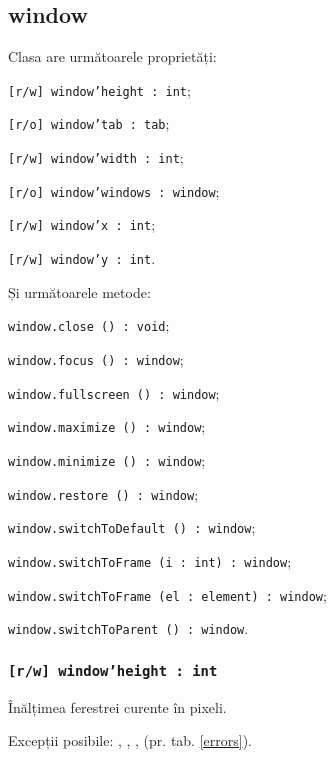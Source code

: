 \subsection{window}

Clasa \window{} are următoarele proprietăți:
\begin{icItems}
	\item \texttt{[r/w] window'height : int};
	\item \texttt{[r/o] window'tab : tab};
	\item \texttt{[r/w] window'width : int};
	\item \texttt{[r/o] window'windows : window};
	\item \texttt{[r/w] window'x : int};
	\item \texttt{[r/w] window'y : int}.
\end{icItems}

Și următoarele metode:
\begin{icItems}
	\item \texttt{window.close () : void};
	\item \texttt{window.focus () : window};
	\item \texttt{window.fullscreen () : window};
	\item \texttt{window.maximize () : window};
	\item \texttt{window.minimize () : window};
	\item \texttt{window.restore () : window};
	\item \texttt{window.switchToDefault () : window};
	\item \texttt{window.switchToFrame (i : int) : window};
	\item \texttt{window.switchToFrame (el : element) : window};
	\item \texttt{window.switchToParent () : window}.
\end{icItems}

\subsubsection{\texttt{[r/w] window'height : int}}

Înălțimea ferestrei curente în pixeli.

Excepții posibile: , , ,  (pr. tab. \ref{errors}).

